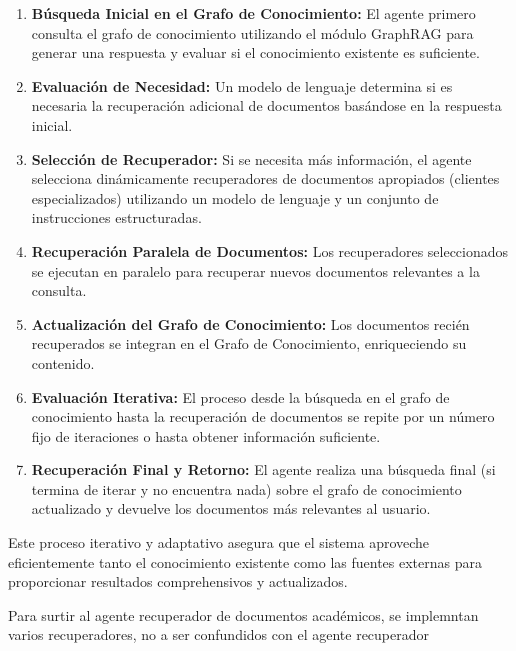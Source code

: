 \documentclass[12pt]{article}
\begin{document}
\begin{enumerate}
    \item \textbf{Búsqueda Inicial en el Grafo de Conocimiento:} El agente primero consulta el grafo de conocimiento utilizando el módulo GraphRAG para generar una respuesta y evaluar si el conocimiento existente es suficiente.
    \item \textbf{Evaluación de Necesidad:} Un modelo de lenguaje determina si es necesaria la recuperación adicional de documentos basándose en la respuesta inicial.
    \item \textbf{Selección de Recuperador:} Si se necesita más información, el agente selecciona dinámicamente recuperadores de documentos apropiados (clientes especializados) utilizando un modelo de lenguaje y un conjunto de instrucciones estructuradas.
    \item \textbf{Recuperación Paralela de Documentos:} Los recuperadores seleccionados se ejecutan en paralelo para recuperar nuevos documentos relevantes a la consulta.
    \item \textbf{Actualización del Grafo de Conocimiento:} Los documentos recién recuperados se integran en el Grafo de Conocimiento, enriqueciendo su contenido.
    \item \textbf{Evaluación Iterativa:} El proceso desde la búsqueda en el grafo de conocimiento hasta la recuperación de documentos se repite por un número fijo de iteraciones o hasta obtener información suficiente.
    \item \textbf{Recuperación Final y Retorno:} El agente realiza una búsqueda final (si termina de iterar y no encuentra nada) sobre el grafo de conocimiento actualizado y devuelve los documentos más relevantes al usuario.
\end{enumerate}

Este proceso iterativo y adaptativo asegura que el sistema aproveche eficientemente tanto el conocimiento existente como las fuentes externas para proporcionar resultados comprehensivos y actualizados.

Para surtir al agente recuperador de documentos académicos, se implemntan varios recuperadores, no a ser confundidos con el agente recuperador
\end{document}
